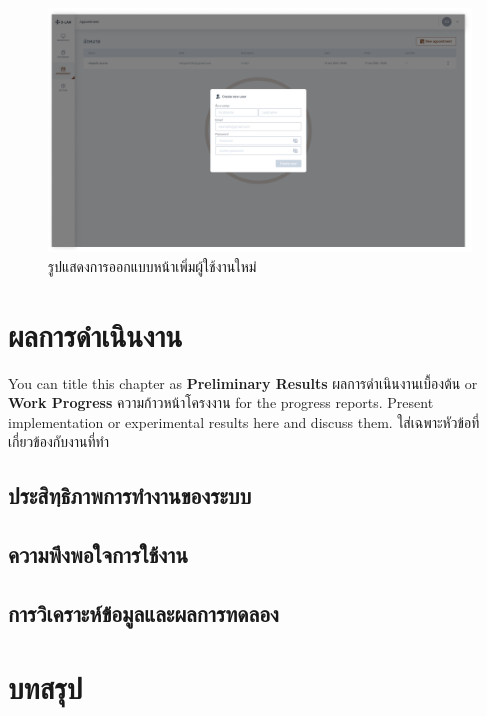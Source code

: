 \documentclass[12pt,oneside,openright,a4paper]{cpe-thai-project}
\begin{document}
\begin{figure}[!h]\centering
  \includegraphics[width=13cm]{./assets/userinterface/setting-create-user.png}
  \caption{รูปแสดงการออกแบบหน้าเพิ่มผู้ใช้งานใหม่}\label{fig:setting-create-user}
\end{figure}


\chapter{ผลการดำเนินงาน}

You can title this chapter as \textbf{Preliminary Results} ผลการดำเนินงานเบื้องต้น or \textbf{Work Progress} ความก้าวหน้าโครงงาน for the progress reports. Present implementation or experimental results here and discuss them.
ใส่เฉพาะหัวข้อที่เกี่ยวข้องกับงานที่ทำ 

\section{ประสิทฺธิภาพการทำงานของระบบ} 
\section{ความพึงพอใจการใช้งาน}
\section{การวิเคราะห์ข้อมูลและผลการทดลอง}

\chapter{บทสรุป}
\end{document}
